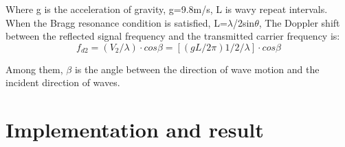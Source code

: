 \documentclass{mcmthesis}
\begin{document}
Where g is the acceleration of gravity, g=9.8m/s, L is wavy repeat intervals. When the Bragg resonance condition is satisfied, L=$\lambda$/2sin$\theta$, The Doppler shift between the reflected signal frequency and the transmitted carrier frequency is:
\begin{equation}
f_{d2}=(V_2/\lambda)\cdot{cos\beta}=\left[(gL/2\pi)1/2/\lambda\right]\cdot{cos\beta}
\end{equation}

Among them, $\beta$ is the angle between the direction of wave motion and the incident direction of waves.





\section{Implementation and result}
\end{document}
